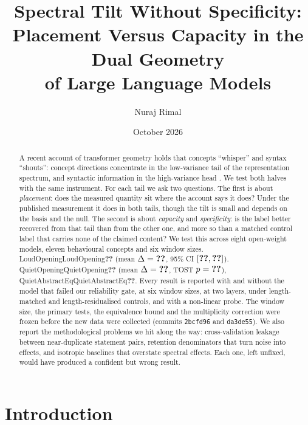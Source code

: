 \documentclass[11pt]{report}
\title{Spectral Tilt Without Specificity:\\
Placement Versus Capacity in the Dual Geometry\\ of Large Language Models}
\author{Nuraj Rimal}  %
\date{October 2026}
\newcommand{\num}[1]{\ifcsname #1\endcsname\csname #1\endcsname\else\textbf{??}\fi}
\newcommand{\pval}[1]{\ifcsname #1Lt\endcsname<\else=\fi\num{#1}}
\newcommand{\prerevcommit}{\texttt{2bcfd96}}
\newcommand{\revcommit}{\texttt{da3de55}} %
\begin{document}
\maketitle

\begin{abstract}
A recent account of transformer geometry holds that concepts ``whisper'' and
syntax ``shouts'': concept directions concentrate in the low-variance tail of the
representation spectrum, and syntactic information in the high-variance head
\citep{acharya2026concepts}. We test both halves with the same instrument. For
each tail we ask two questions. The first is about \emph{placement}: does the
measured quantity sit where the account says it does? Under the published
measurement it does in both tails, though the tilt is small and depends on the
basis and the null. The second is about \emph{capacity} and \emph{specificity}: is the
label better recovered from that tail than from the other one, and more so than
a matched control label that carries none of the claimed content? We test this
across eight open-weight models, eleven behavioural concepts and six window
sizes. \num{LoudOpening} (mean $\Delta = \num{LoudFinalDeltaAllMean}$, 95\% CI
$[\num{LoudFinalDeltaAllCILo}, \num{LoudFinalDeltaAllCIHi}]$).
\num{QuietOpening} (mean $\Delta = \num{QuietMidDeltaAllMean}$, TOST
$p \pval{QuietMidDeltaAllPTOST}$), \num{QuietAbstractEq}. Every result is
reported with and without the model that failed our reliability gate, at six
window sizes, at two layers, under length-matched and length-residualised
controls, and with a non-linear probe.
The window size, the primary tests, the equivalence bound and the
multiplicity correction were frozen before the new data were collected (commits
\prerevcommit{} and \revcommit). We also report the methodological problems we
hit along the way: cross-validation leakage between near-duplicate statement
pairs, retention denominators that turn noise into effects, and isotropic
baselines that overstate spectral effects. Each one, left unfixed, would have
produced a confident but wrong result.
\end{abstract}

\tableofcontents

\chapter{Introduction}
\end{document}
